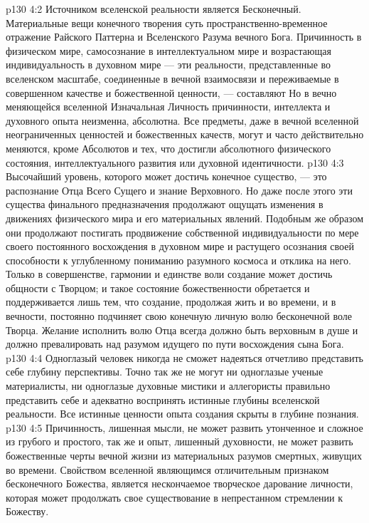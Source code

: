 \vs p130 4:2 \pc Источником вселенской реальности является Бесконечный. Материальные вещи конечного творения суть пространственно\hyp{}временное отражение Райского Паттерна и Вселенского Разума вечного Бога. Причинность в физическом мире, самосознание в интеллектуальном мире и возрастающая индивидуальность в духовном мире --- эти реальности, представленные во вселенском масштабе, соединенные в вечной взаимосвязи и переживаемые в совершенном качестве и божественной ценности, --- составляют  Но в вечно меняющейся вселенной Изначальная Личность причинности, интеллекта и духовного опыта неизменна, абсолютна. Все предметы, даже в вечной вселенной неограниченных ценностей и божественных качеств, могут и часто действительно меняются, кроме Абсолютов и тех, что достигли абсолютного физического состояния, интеллектуального развития или духовной идентичности.
\vs p130 4:3 Высочайший уровень, которого может достичь конечное существо, --- это распознание Отца Всего Сущего и знание Верховного. Но даже после этого эти существа финального предназначения продолжают ощущать изменения в движениях физического мира и его материальных явлений. Подобным же образом они продолжают постигать продвижение собственной индивидуальности по мере своего постоянного восхождения в духовном мире и растущего осознания своей способности к углубленному пониманию разумного космоса и отклика на него. Только в совершенстве, гармонии и единстве воли создание может достичь общности с Творцом; и такое состояние божественности обретается и поддерживается лишь тем, что создание, продолжая жить и во времени, и в вечности, постоянно подчиняет свою конечную личную волю бесконечной воле Творца. Желание исполнить волю Отца всегда должно быть верховным в душе и должно превалировать над разумом идущего по пути восхождения сына Бога.
\vs p130 4:4 Одноглазый человек никогда не сможет надеяться отчетливо представить себе глубину перспективы. Точно так же не могут ни одноглазые ученые материалисты, ни одноглазые духовные мистики и аллегористы правильно представить себе и адекватно воспринять истинные глубины вселенской реальности. Все истинные ценности опыта создания скрыты в глубине познания.
\vs p130 4:5 Причинность, лишенная мысли, не может развить утонченное и сложное из грубого и простого, так же и опыт, лишенный духовности, не может развить божественные черты вечной жизни из материальных разумов смертных, живущих во времени. Свойством вселенной являющимся отличительным признаком бесконечного Божества, является нескончаемое творческое дарование личности, которая может продолжать свое существование в непрестанном стремлении к Божеству.
